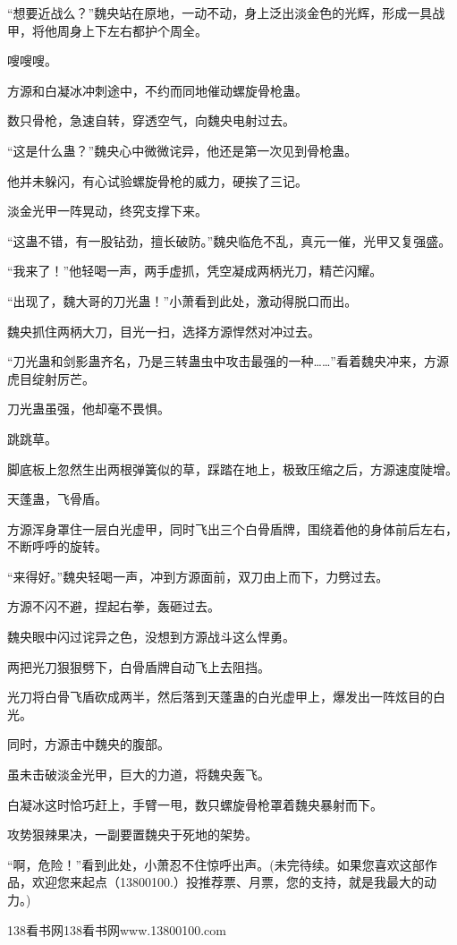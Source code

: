 \begin{this_body}
“想要近战么？”魏央站在原地，一动不动，身上泛出淡金色的光辉，形成一具战甲，将他周身上下左右都护个周全。

嗖嗖嗖。

方源和白凝冰冲刺途中，不约而同地催动螺旋骨枪蛊。

数只骨枪，急速自转，穿透空气，向魏央电射过去。

“这是什么蛊？”魏央心中微微诧异，他还是第一次见到骨枪蛊。

他并未躲闪，有心试验螺旋骨枪的威力，硬挨了三记。

淡金光甲一阵晃动，终究支撑下来。

“这蛊不错，有一股钻劲，擅长破防。”魏央临危不乱，真元一催，光甲又复强盛。

“我来了！”他轻喝一声，两手虚抓，凭空凝成两柄光刀，精芒闪耀。

“出现了，魏大哥的刀光蛊！”小萧看到此处，激动得脱口而出。

魏央抓住两柄大刀，目光一扫，选择方源悍然对冲过去。

“刀光蛊和剑影蛊齐名，乃是三转蛊虫中攻击最强的一种……”看着魏央冲来，方源虎目绽射厉芒。

刀光蛊虽强，他却毫不畏惧。

跳跳草。

脚底板上忽然生出两根弹簧似的草，踩踏在地上，极致压缩之后，方源速度陡增。

天蓬蛊，飞骨盾。

方源浑身罩住一层白光虚甲，同时飞出三个白骨盾牌，围绕着他的身体前后左右，不断呼呼的旋转。

“来得好。”魏央轻喝一声，冲到方源面前，双刀由上而下，力劈过去。

方源不闪不避，捏起右拳，轰砸过去。

魏央眼中闪过诧异之色，没想到方源战斗这么悍勇。

两把光刀狠狠劈下，白骨盾牌自动飞上去阻挡。

光刀将白骨飞盾砍成两半，然后落到天蓬蛊的白光虚甲上，爆发出一阵炫目的白光。

同时，方源击中魏央的腹部。

虽未击破淡金光甲，巨大的力道，将魏央轰飞。

白凝冰这时恰巧赶上，手臂一甩，数只螺旋骨枪罩着魏央暴射而下。

攻势狠辣果决，一副要置魏央于死地的架势。

“啊，危险！”看到此处，小萧忍不住惊呼出声。(未完待续。如果您喜欢这部作品，欢迎您来起点（13800100.）投推荐票、月票，您的支持，就是我最大的动力。)

138看书网138看书网www.13800100.com

\end{this_body}

